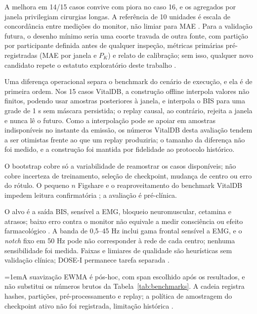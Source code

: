 \documentclass[12pt]{article}
\begin{document}
A melhora em 14/15 casos convive com piora no caso 16, e os agregados por janela privilegiam cirurgias longas. A referência de 10 unidades é escala de concordância entre medições do monitor, não limiar para MAE \cite{harada2021}. Para a validação futura, o desenho mínimo seria uma coorte travada de outra fonte, com partição por participante definida antes de qualquer inspeção, métricas primárias pré-registradas (MAE por janela e $P_K$) e relato de calibração; sem isso, qualquer novo candidato repete o estatuto exploratório deste trabalho \cite{tripodai,archer2021}.

Uma diferença operacional separa o benchmark do cenário de execução, e ela é de primeira ordem. Nos 15 casos VitalDB, a construção offline interpola valores não finitos, podendo usar amostras posteriores à janela, e interpola o BIS para uma grade de 1 s sem máscara persistida; o replay causal, ao contrário, rejeita a janela e nunca lê o futuro. Como a interpolação pode se apoiar em amostras indisponíveis no instante da emissão, os números VitalDB desta avaliação tendem a ser otimistas frente ao que um replay produziria; o tamanho da diferença não foi medido, e a construção foi mantida por fidelidade ao protocolo histórico.

O bootstrap cobre só a variabilidade de reamostrar os casos disponíveis; não cobre incerteza de treinamento, seleção de checkpoint, mudança de centro ou erro do rótulo. O pequeno $n$ Figshare e o reaproveitamento do benchmark VitalDB impedem leitura confirmatória \cite{field2007,archer2021}; a avaliação é pré-clínica.

O alvo é a saída BIS, sensível a EMG, bloqueio neuromuscular, cetamina e atrasos; baixo erro contra o monitor não equivale a medir consciência ou efeito farmacológico \cite{schuller2015,hans2005,pilge2006}. A banda de 0,5--45 Hz inclui gama frontal sensível a EMG, e o \textit{notch} fixo em 50 Hz pode não corresponder à rede de cada centro; nenhuma sensibilidade foi medida. Faixas e limiares de qualidade são heurísticas sem validação clínica; DOSE-I permanece tarefa separada \cite{dosei}.

\begingroup\emergencystretch=1em\relax A suavização EWMA é pós-hoc, com span escolhido após os resultados, e não substitui os números brutos da Tabela~\ref{tab:benchmarks}. A cadeia registra hashes, partições, pré-processamento e replay; a política de amostragem do checkpoint ativo não foi registrada, limitação histórica \cite{tripodai}.
\par\endgroup
\end{document}
